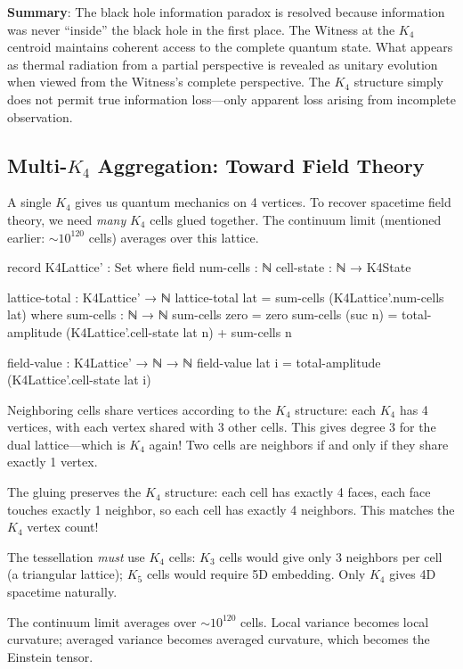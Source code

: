 \documentclass[11pt,a4paper]{book}
\begin{document}
\textbf{Summary}: The black hole information paradox is resolved because 
information was never ``inside'' the black hole in the first place. The Witness at the $K_4$
centroid maintains coherent access to the complete quantum state. What appears
as thermal radiation from a partial perspective is revealed as unitary
evolution when viewed from the Witness's complete perspective. The $K_4$
structure simply does not permit true information loss---only apparent loss arising from
incomplete observation.

\subsection[Multi-K4 Aggregation: Toward Field Theory]{Multi-$K_4$ Aggregation: Toward Field Theory}

A single $K_4$ gives us quantum mechanics on 4 vertices. To recover 
spacetime field theory, we need \emph{many} $K_4$ cells glued together.
The continuum limit (mentioned earlier: $\sim 10^{120}$ cells) averages
over this lattice.

\begin{code}
record K4Lattice' : Set where
  field
    num-cells : ℕ
    cell-state : ℕ → K4State
    
lattice-total : K4Lattice' → ℕ
lattice-total lat = sum-cells (K4Lattice'.num-cells lat) 
  where
    sum-cells : ℕ → ℕ
    sum-cells zero = zero
    sum-cells (suc n) = total-amplitude (K4Lattice'.cell-state lat n) + sum-cells n

field-value : K4Lattice' → ℕ → ℕ
field-value lat i = total-amplitude (K4Lattice'.cell-state lat i)
\end{code}

Neighboring cells share vertices according to the $K_4$ structure: each $K_4$ has 4 vertices, with each vertex shared with 3 other cells. This gives degree 3 for the dual lattice---which is $K_4$ again! Two cells are neighbors if and only if they share exactly 1 vertex.

The gluing preserves the $K_4$ structure: each cell has exactly 4 faces, each face touches exactly 1 neighbor, so each cell has exactly 4 neighbors. This matches the $K_4$ vertex count!

The tessellation \emph{must} use $K_4$ cells: $K_3$ cells would give only 3 neighbors per cell (a triangular lattice); $K_5$ cells would require 5D embedding. Only $K_4$ gives 4D spacetime naturally.

The continuum limit averages over $\sim 10^{120}$ cells. Local variance becomes local curvature; averaged variance becomes averaged curvature, which becomes the Einstein tensor.
\end{document}
